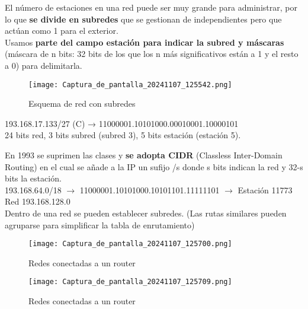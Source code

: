 \documentclass{article}
\begin{document}
El número de estaciones en una red puede ser muy grande para administrar, por lo que \textbf{se divide en subredes} que se gestionan de independientes pero que actúan como 1 para el exterior. \\
Usamos \textbf{parte del campo estación para indicar la subred y máscaras} (máscara de n bits: 32 bits de los que los n más significativos están a 1 y el resto a 0) para delimitarla. \\

\begin{figure}[h]
    \centering
    \texttt{[image: Captura\_de\_pantalla\_20241107\_125542.png]}
    \caption{Esquema de red con subredes}
    \label{fig:etiqueta}
\end{figure}

193.168.17.133/27 (C) → 11000001.10101000.00010001.10000101 \\
24 bits red, 3 bits subred (subred 3), 5 bits estación (estación 5). \\

\newpage

En 1993 se suprimen las clases y \textbf{se adopta CIDR} (Classless Inter-Domain Routing) en el cual se añade a la IP un sufijo /s donde s bits indican la red y 32-s bits la estación. \\
193.168.64.0/18 $\xrightarrow{}$ 11000001.10101000.10101101.11111101 $\xrightarrow{}$ Estación 11773 Red 193.168.128.0 \\
Dentro de una red se pueden establecer subredes. (Las rutas similares pueden agruparse para simplificar la tabla de enrutamiento) \\

\begin{figure}[h]
    \centering
    \texttt{[image: Captura\_de\_pantalla\_20241107\_125700.png]}
    \caption{Redes conectadas a un router}
    \label{fig:etiqueta}
\end{figure}

\begin{figure}[h]
    \centering
    \texttt{[image: Captura\_de\_pantalla\_20241107\_125709.png]}
    \caption{Redes conectadas a un router}
    \label{fig:etiqueta}
\end{figure}

\newpage
\end{document}
